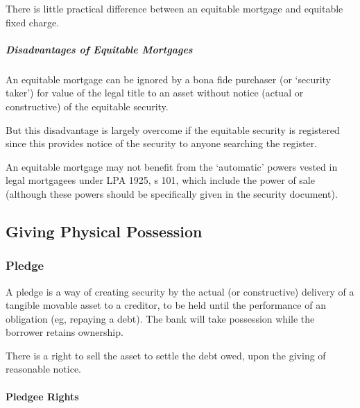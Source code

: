 \documentclass[
]{article}
\newenvironment{Shaded}{}{}
\newcommand{\NormalTok}[1]{#1}
\begin{document}
There is little practical difference between an equitable mortgage and
equitable fixed charge.

\hypertarget{disadvantages-of-equitable-mortgages}{%
\subparagraph{Disadvantages of Equitable
Mortgages}\label{disadvantages-of-equitable-mortgages}}

\begin{Shaded}
\begin{Highlighting}[]
\NormalTok{An equitable mortgage can be ignored by a bona fide purchaser (or ‘security taker’) for value of the legal title to an asset without notice (actual or constructive) of the equitable security.}
\end{Highlighting}
\end{Shaded}

But this disadvantage is largely overcome if the equitable security is
registered since this provides notice of the security to anyone
searching the register.

An equitable mortgage may not benefit from the `automatic' powers vested
in legal mortgagees under LPA 1925, s 101, which include the power of
sale (although these powers should be specifically given in the security
document).

\hypertarget{giving-physical-possession}{%
\subsection{Giving Physical
Possession}\label{giving-physical-possession}}

\hypertarget{pledge}{%
\subsubsection{Pledge}\label{pledge}}

\begin{Shaded}
\begin{Highlighting}[]
\NormalTok{A pledge is a way of creating security by the actual (or constructive) delivery of a tangible movable asset to a creditor, to be held until the performance of an obligation (eg, repaying a debt). The bank will take possession while the borrower retains ownership.}
\end{Highlighting}
\end{Shaded}

There is a right to sell the asset to settle the debt owed, upon the
giving of reasonable notice.

\hypertarget{pledgee-rights}{%
\paragraph{Pledgee Rights}\label{pledgee-rights}}
\end{document}
